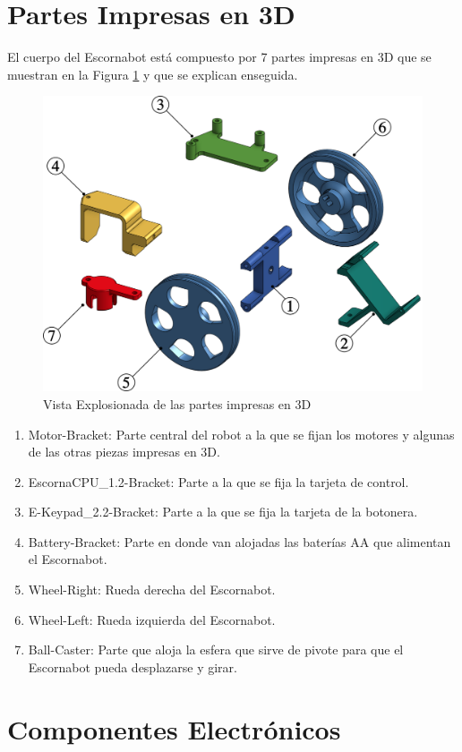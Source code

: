 \documentclass{article}
\begin{document}
\section{Partes Impresas en 3D}
El cuerpo del Escornabot está compuesto por 7 partes impresas en 3D que se muestran en la Figura \ref{fig:exploded_view_1} y que se explican enseguida.

\begin{figure}[H]
    \centering
    \includegraphics[width=0.75\columnwidth]{images/3DParts/Exploded_view_1.png}
    \caption{Vista Explosionada de las partes impresas en 3D}
    \label{fig:exploded_view_1}
\end{figure}

\begin{enumerate}
    \item Motor-Bracket: Parte central del robot a la que se fijan los motores y algunas de las otras piezas impresas en 3D.
    \item EscornaCPU\_1.2-Bracket: Parte a la que se fija la tarjeta de control.
    \item E-Keypad\_2.2-Bracket: Parte a la que se fija la tarjeta de la botonera.
    \item Battery-Bracket: Parte en donde van alojadas las baterías AA que alimentan el Escornabot.
    \item Wheel-Right: Rueda derecha del Escornabot.
    \item Wheel-Left: Rueda izquierda del Escornabot.
    \item Ball-Caster: Parte que aloja la esfera que sirve de pivote para que el Escornabot pueda desplazarse y girar.
\end{enumerate}

\section{Componentes Electrónicos}
\end{document}
